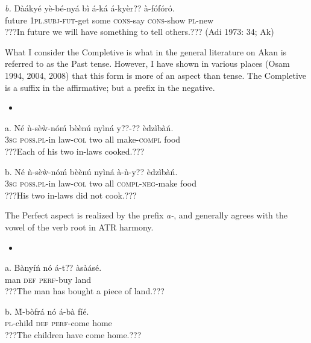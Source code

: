 \documentclass[output=paper]{langsci/langscibook}
\begin{document}
\gll \emph{b.  }D\`{a}\'{a}ky\'{e} y\`{e}-b\'{e}-ny\'{a}    b\`{i}  \'{a}-k\'{a}    \'{a}-ky\`{e}r??    \`{a}-f\'{o}f\'{o}r\'{o}.  \\
       future   \textsc{1pl.subj}{}-\textsc{fut}{}-get  some  \textsc{cons}{}-say\textsc{   cons}{}-show  \textsc{pl}{}-new\\
\glt    ???In future we will have something to tell others.??? (Adi 1973: 34; Ak)
\z

What I consider the Completive is what in the general literature on Akan is referred to as the Past tense. However, I have shown in various places (Osam 1994, 2004, 2008) that this form is more of an aspect than tense. The Completive is a suffix in the affirmative; but a prefix in the negative.  

\begin{itemize}
\item \end{itemize}
\gll \textup{a.}  N\'{e}  \`{n}-s\`{e}\`{w}-n\'{o}\'{m}    b\`{e}\`{e}n\'{u}   ny\`{i}n\'{a}  y??-??    \`{e}dz\`{i}b\`{a}\'{n}.\\
     \textsc{\textup{  }}\textsc{\textup{3sg}}   \textsc{poss.pl}{}-in law-\textsc{col}  two   all  make-\textsc{compl}  food\\
\glt ???Each of his two in-laws cooked.??? \citep[57]{Krampah1970}
\z

\gll \textup{b.  }N\'{e}  \`{n}-s\`{e}\`{w}-n\'{o}\'{m}    b\`{e}\`{e}n\'{u}   ny\`{i}n\'{a}  \`{a}-\`{n}-y??      \`{e}dz\`{i}b\`{a}\'{n}.\\
     \textsc{  3sg}   \textsc{poss.pl}{}-in law-\textsc{col}  two  all  \textsc{compl-neg}{}-make  food\\
\glt ???His two in-laws did not cook.???
\z

The Perfect aspect is realized by the prefix \emph{a-}, and generally agrees with the vowel of the verb root in ATR harmony.

\begin{itemize}
\item \end{itemize}
\gll \textup{a.}  B\`{a}ny\'{i}\'{n} n\'{o}  \'{a}-t??     \`{a}s\`{a}\'{a}s\'{e}.\\
       man  \textsc{def}  \textsc{perf}{}-buy  land\\
\glt ???The man has bought a piece of land.???
\z

\gll \textup{b.  }\`{M}-b\`{o}fr\'{a}  n\'{o}  \'{a}-b\`{a}    f\'{i}\'{e}.\\
     \textsc{  pl}{}-child  \textsc{def}  \textsc{perf}{}-come  home\\
\glt ???The children have come home.???
\z
\end{document}
